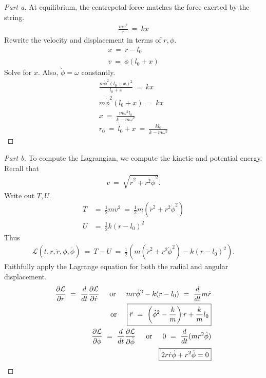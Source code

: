 \documentclass{article}
\numberwithin{equation}{section}
\newcommand{\textOr}{
    {
        \hspace{5mm}
        \textrm{or}
        \hspace{5mm}
    }
}
\newcommand{\deriv}[2]{
\frac {d {#1} } {d {#2}}
}
\newcommand{\pderiv}[2]{
\frac {\partial {#1} } {\partial {#2}}
}
\begin{document}
\begin{proof}[Part a]
    At equilibrium, the centrepetal force matches the force 
    exerted by the string. 
    \begin{align}
        \frac {m v^2} r \ = \ kx
    \end{align}
    Rewrite the velocity and displacement in terms of $r, \phi$. 
    \begin{align}
        x \ = \ r - l_0 \\ 
        v \ = \ \dot\phi (l_0 + x)
    \end{align}
    Solve for $x$. Also, $\dot \phi = \omega$ constantly. 
    \begin{align}
        \frac{m \dot \phi^2 (l_0 + x)^2} {l_0 + x} \ = \ kx \\ 
        m \dot \phi^2 (l_0 + x) \ = \ kx \\ 
        x \ = \ \frac {m \omega^2 l_0} {k - m \omega^2}\\
        \boxed{
            r_0 \ = \ l_0 + x \ = \ \frac{k l_0}{k - m \omega^2} 
        }
    \end{align}
\end{proof}

\begin{proof}[Part b]
    To compute the Lagrangian, we compute the kinetic and potential energy. 
    Recall that 
    \begin{align}
        v \ = \ \sqrt{\dot r^2 + r^2 \dot \phi^2}.
    \end{align}
    Write out $T, U$. 
    \begin{align}
        T & = \ \frac 1 2 mv^2 \ = \ \frac 1 2 m (\dot r^2 + r^2 \dot \phi^2) \\ 
        U & = \ \frac 1 2 k (r - l_0)^2
    \end{align}
    Thus 
    \begin{align}
        \mathcal L(t, r, \dot r, \phi, \dot \phi)  \ = \ T - U \ = \  
        \frac 1 2 \left(
            m (\dot r^2 + r^2 \dot \phi^2) - k(r - l_0)^2
        \right).
    \end{align}
    Faithfully apply the Lagrange equation for both the radial and 
    angular displacement. 
    \begin{align}
       \pderiv{\mathcal L}{r} \ = \ \deriv{}{t} \pderiv{\mathcal L} {\dot r} 
       \textOr 
       m r \dot \phi^2 - k(r - l_0)  \ = \ \deriv{}{t} m \dot r \nonumber \\ \textOr 
       \boxed{\ddot r \ = \ \left(\dot\phi^2 - \frac k m\right) r + \frac k m l_0}\\
       \pderiv{\mathcal L}{\phi} \ = \ \deriv{}{t} \pderiv{\mathcal L}{\dot \phi} 
       \textOr 0 \ = \ \deriv{}{t} (mr^2\dot\phi) \nonumber\\ 
       \boxed{
        2 r\dot r \dot \phi + r^2 \ddot \phi = 0
       }
    \end{align}
\end{proof}
    
\end{document}
